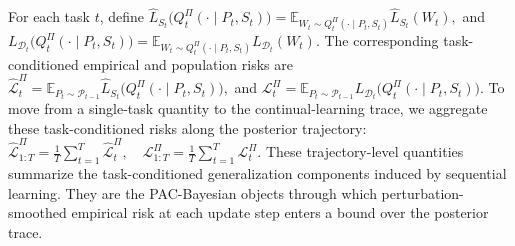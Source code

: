 \documentclass{article}
\begin{document}
For each task $t$, define
$
\widehat L_{S_t}
\bigl(
Q_t^\Pi(\cdot\mid P_t,S_t)
\bigr)
=
\mathbb E_{W_t\sim Q_t^\Pi(\cdot\mid P_t,S_t)}
\widehat L_{S_t}(W_t),
$
and
$
L_{\mathcal D_t}
\bigl(
Q_t^\Pi(\cdot\mid P_t,S_t)
\bigr)
=
\mathbb E_{W_t\sim Q_t^\Pi(\cdot\mid P_t,S_t)}
L_{\mathcal D_t}(W_t).
$
The corresponding task-conditioned empirical and population risks are
$
\widehat{\mathcal L}_t^\Pi
=
\mathbb E_{P_t\sim\mathcal P_{t-1}}
\widehat L_{S_t}
\bigl(
Q_t^\Pi(\cdot\mid P_t,S_t)
\bigr),
$
and
$
\mathcal L_t^\Pi
=
\mathbb E_{P_t\sim\mathcal P_{t-1}}
L_{\mathcal D_t}
\bigl(
Q_t^\Pi(\cdot\mid P_t,S_t)
\bigr).
$
To move from a single-task quantity to the continual-learning trace, we aggregate these task-conditioned risks along the posterior trajectory:
$
\widehat{\mathcal L}_{1:T}^\Pi
=
\frac{1}{T}
\sum_{t=1}^{T}
\widehat{\mathcal L}_t^\Pi,
\quad
\mathcal L_{1:T}^\Pi
=
\frac{1}{T}
\sum_{t=1}^{T}
\mathcal L_t^\Pi .
$
These trajectory-level quantities summarize the task-conditioned generalization components induced by sequential learning.
They are the PAC-Bayesian objects through which perturbation-smoothed empirical risk at each update step enters a bound over the posterior trace.






\end{document}
